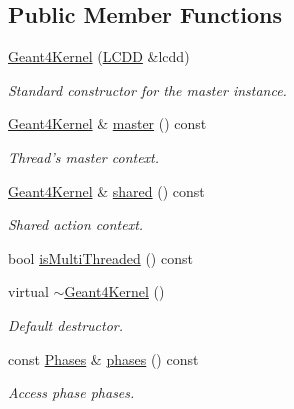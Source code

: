 \subsection*{Public Member Functions}
\begin{DoxyCompactItemize}
\item 
\hyperlink{class_d_d4hep_1_1_simulation_1_1_geant4_kernel_afa28c3122a6607f3641d22f1c1602786}{Geant4Kernel} (\hyperlink{class_d_d4hep_1_1_geometry_1_1_l_c_d_d}{LCDD} \&lcdd)
\begin{DoxyCompactList}\small\item\em Standard constructor for the master instance. \item\end{DoxyCompactList}\item 
\hyperlink{class_d_d4hep_1_1_simulation_1_1_geant4_kernel}{Geant4Kernel} \& \hyperlink{class_d_d4hep_1_1_simulation_1_1_geant4_kernel_a38ec8e1c3c5469aceaf178973386ddfc}{master} () const 
\begin{DoxyCompactList}\small\item\em Thread's master context. \item\end{DoxyCompactList}\item 
\hyperlink{class_d_d4hep_1_1_simulation_1_1_geant4_kernel}{Geant4Kernel} \& \hyperlink{class_d_d4hep_1_1_simulation_1_1_geant4_kernel_aaa64984b672200e290612ccfef93f162}{shared} () const 
\begin{DoxyCompactList}\small\item\em Shared action context. \item\end{DoxyCompactList}\item 
bool \hyperlink{class_d_d4hep_1_1_simulation_1_1_geant4_kernel_a053a94be9966b7851bf25fdafb9a9d01}{isMultiThreaded} () const 
\item 
virtual \hyperlink{class_d_d4hep_1_1_simulation_1_1_geant4_kernel_a57dadf34909a60f7771fa15d4b7501d4}{$\sim$Geant4Kernel} ()
\begin{DoxyCompactList}\small\item\em Default destructor. \item\end{DoxyCompactList}\item 
const \hyperlink{class_d_d4hep_1_1_simulation_1_1_geant4_kernel_ae28985781d4226ece4c3fffe8827b400}{Phases} \& \hyperlink{class_d_d4hep_1_1_simulation_1_1_geant4_kernel_abebf51658a09e2e47dda6cd46e803ee0}{phases} () const 
\begin{DoxyCompactList}\small\item\em Access phase phases. \item\end{DoxyCompactList}\item 

\end{DoxyCompactItemize}
